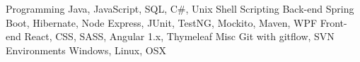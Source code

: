 
\begin{cvskills}
    \cvskill
        {Programming}
        {Java, JavaScript, SQL, C\#, Unix Shell Scripting}
    \cvskill
        {Back-end}
        {Spring Boot, Hibernate, Node Express, JUnit, TestNG, Mockito, Maven, WPF}
    \cvskill
        {Front-end}
        {React, CSS, SASS, Angular 1.x, Thymeleaf}
    \cvskill
        {Misc}
        {Git with gitflow, SVN}
    \cvskill
        {Environments}
        {Windows, Linux, OSX}
\end{cvskills}